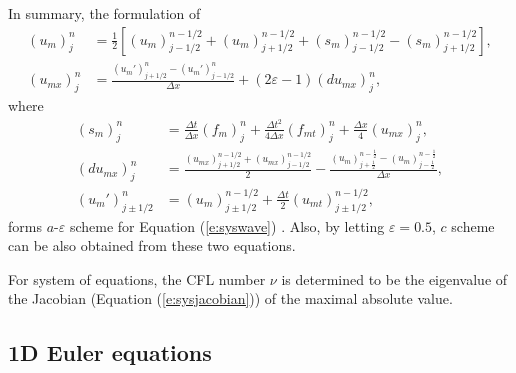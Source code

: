 \documentclass[11pt,dvips]{article}
\numberwithin{equation}{section}
\begin{document}
In summary, the formulation of
\begin{align}
  (u_m)_j^n &= \frac{1}{2}\left[
      (u_m)_{j-1/2}^{n-1/2} + (u_m)_{j+1/2}^{n-1/2}
    + (s_m)_{j-1/2}^{n-1/2} - (s_m)_{j+1/2}^{n-1/2}
    \right], \label{e:sysaeu} \\
  (u_{mx})_j^n &= \frac{(u_m')_{j+1/2}^n-(u_m')_{j-1/2}^n}{\Delta x}
    + (2\varepsilon-1)(du_{mx})_j^n, \label{e:sysaeux}
\end{align}
where
\begin{align*}
  (s_m)_j^n &=
      \frac{\Delta t}  {\Delta x} (f_m)_j^n
    + \frac{\Delta t^2}{4\Delta x}(f_{mt})_j^n
    + \frac{\Delta x}  {4}        (u_{mx})_j^n, \\
  (du_{mx})_j^n &=
      \frac{(u_{mx})_{j+1/2}^{n-1/2}
                  + (u_{mx})_{j-1/2}^{n-1/2}}{2}
    - \frac{(u_m)_{j+\frac{1}{2}}^{n-\frac{1}{2}}
          - (u_m)_{j-\frac{1}{2}}^{n-\frac{1}{2}}}
           {\Delta x}, \\
  (u_m')_{j\pm1/2}^n &=
      (u_m)_{j\pm1/2}^{n-1/2}
    + \frac{\Delta t}{2}(u_{mt})_{j\pm1/2}^{n-1/2},
\end{align*}
forms $a$-$\varepsilon$ scheme for Equation (\ref{e:syswave})
\citep{chang_method_1995}.  Also, by letting $\varepsilon=0.5$, $c$ scheme can
be also obtained from these two equations.

For system of equations, the CFL number $\nu$ is determined to be the
eigenvalue of the Jacobian (Equation (\ref{e:sysjacobian})) of the
maximal absolute value.

\subsection{1D Euler equations}
\end{document}
